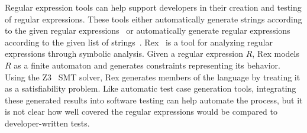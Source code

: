 Regular expression tools can help support developers in their creation and testing of regular expressions. These tools either automatically generate strings according to the given regular expressions~\cite{hampi, kiezun2009hampi, rex, brics} or automatically generate regular expressions according to the given list of strings~\cite{Babbar:2010:CBA:1871840.1871848, Li:2008:REL:1613715.1613719}. 
Rex~\cite{rex} is a tool for analyzing regular expressions through symbolic analysis.  
Given a regular expression $R$, Rex models $R$ as a finite automaton and generates constraints representing its behavior. Using the Z3~\cite{de2008z3} SMT solver, Rex generates members of the language by treating it as a satisfiability problem.  %
Like automatic test case generation tools, integrating these generated results into software testing can help automate the process, but it is not clear how well covered the regular expressions would be compared to developer-written tests.

